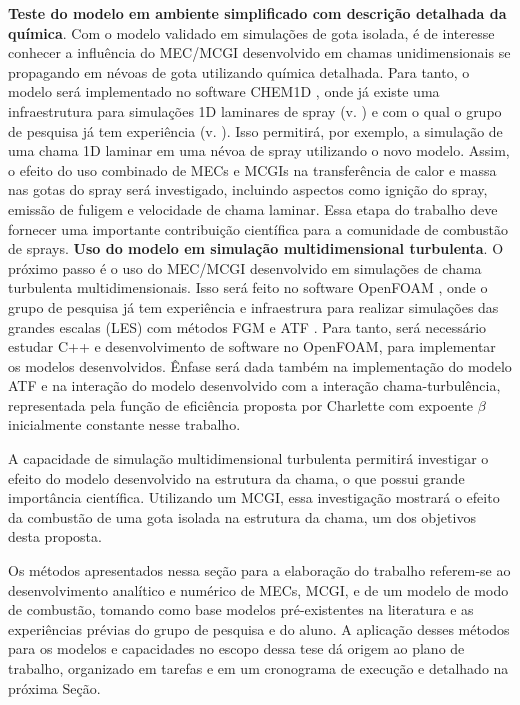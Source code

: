 \textbf{Teste do modelo em ambiente simplificado com descrição detalhada da química}.
Com o modelo validado em simulações de gota isolada, é de interesse conhecer a influência do MEC/MCGI desenvolvido em chamas unidimensionais se propagando em névoas de gota utilizando química detalhada.
Para tanto, o modelo será implementado no software CHEM1D \cite{Sommers1994PhD}, onde já existe uma infraestrutura para simulações 1D laminares de spray (v. \cite{Sommers1994PhD,vanOijen2002CTM,vanOijen2016PECS, SacomanoF2018CTM,SacomanoF2021Fluids}) e com o qual o grupo de pesquisa já tem experiência (v. \cite{SacomanoF2018CTM,SacomanoF2019IJHMT,SacomanoF2021Fluids,SacomanoF2024CF,SacomanoF2025CF}).
Isso permitirá, por exemplo, a simulação de uma chama 1D laminar em uma névoa de spray utilizando o novo modelo.
Assim, o efeito do uso combinado de MECs e MCGIs na transferência de calor e massa nas gotas do spray será investigado, incluindo aspectos como ignição do spray, emissão de fuligem e velocidade de chama laminar.
Essa etapa do trabalho deve fornecer uma importante contribuição científica para a comunidade de combustão de sprays.
\textbf{Uso do modelo em simulação multidimensional turbulenta}.
O próximo passo é o uso do MEC/MCGI desenvolvido em simulações de chama turbulenta multidimensionais.
Isso será feito no software OpenFOAM \cite{JasakOpenFOAM}, onde o grupo de pesquisa já tem experiência e infraestrura para realizar simulações das grandes escalas (LES) com métodos FGM e ATF \cite{SacomanoF2017PhD,SacomanoF2017CF,SacomanoF2020CF}.
Para tanto, será necessário estudar C++ e desenvolvimento de software no OpenFOAM, para implementar os modelos desenvolvidos.
Ênfase será dada também na implementação do modelo ATF e na interação do modelo desenvolvido com a interação chama-turbulência, representada pela função de eficiência proposta por Charlette \cite{CharletteF2002} com expoente $\beta$ inicialmente constante nesse trabalho. 

A capacidade de simulação multidimensional turbulenta permitirá investigar o efeito do modelo desenvolvido na estrutura da chama, o que possui grande importância científica.
Utilizando um MCGI, essa investigação mostrará o efeito da combustão de uma gota isolada na estrutura da chama, um dos objetivos desta proposta.

Os métodos apresentados nessa seção para a elaboração do trabalho  referem-se ao desenvolvimento analítico e numérico de MECs, MCGI, e de um modelo de modo de combustão, tomando como base modelos pré-existentes na literatura e as experiências prévias do grupo de pesquisa e do aluno.
A aplicação desses métodos para os modelos e capacidades no escopo dessa tese dá origem ao plano de trabalho, organizado em tarefas e em um cronograma de execução e detalhado na próxima Seção.



